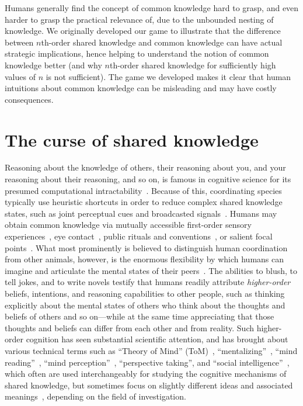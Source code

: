 \documentclass[twocolumn,a4paper,superscriptaddress,nofootinbib]{revtex4}
\begin{document}
Humans generally find the concept of common knowledge hard to grasp, and even harder to grasp the practical relevance of, due to the unbounded nesting of knowledge. We originally developed our game to illustrate that the difference between $n$th-order shared knowledge and common knowledge can have actual strategic implications, hence helping to understand the notion of common knowledge better (and why $n$th-order shared knowledge for sufficiently high values of $n$ is not sufficient). The game we developed makes it clear that human intuitions about common knowledge can be misleading and may have costly consequences.

\section{The curse of shared knowledge}
Reasoning about the knowledge of others, their reasoning about you, and your reasoning about their reasoning, and so on, is famous in cognitive science for its presumed computational intractability~\citep{van2018parameterized,bolander2023parameterized}. Because of this, coordinating species typically use heuristic shortcuts in order to reduce complex shared knowledge states, such as joint perceptual cues and broadcasted signals~\citep{milgrom1981axiomatic, clark1996using, bradbury1998principles}. Humans may obtain common knowledge via mutually accessible first-order sensory experiences~\citep{tomasello1995joint, lorini2005establishing, bolander2015announcements, gintis2010rationality}, eye contact~\citep{friedell1969structure}, public rituals and conventions~\citep{lewis1969convention}, or salient focal points~\citep{schelling1957bargaining}. What most prominently is believed to distinguish human coordination from other animals, however, is the enormous flexibility by which humans can imagine and articulate the mental states of their peers~\citep{tooby2010groups, harari2014sapiens}. The abilities to blush, to tell jokes, and to write novels testify that humans readily attribute \textit{higher-order} beliefs, intentions, and reasoning capabilities to other people, such as thinking explicitly about the mental states of others who think about the thoughts and beliefs of others and so on---while at the same time appreciating that those thoughts and beliefs can differ from each other and from reality. Such higher-order cognition has seen substantial scientific attention, and has brought about various technical terms such as ``Theory of Mind'' (ToM)~\citep{premack1978does}, ``mentalizing''~\citep{frith2003development}, ``mind reading''~\citep{vogeley2001mind, apperly2010mindreaders}, %
``mind perception''~\citep{gray2011distortions}, ``perspective taking'', and ``social intelligence''~\citep{baron1999social}, which often are used interchangeably for studying the cognitive mechanisms of shared knowledge, but sometimes focus on slightly different ideas and associated meanings~\citep{schaafsma2015deconstructing}, depending on the field of investigation.
\end{document}
